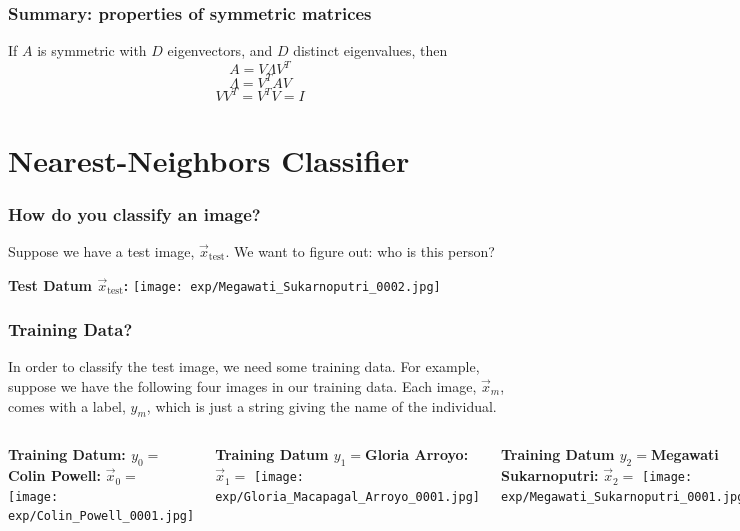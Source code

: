 \documentclass{beamer}
\begin{document}
\begin{frame}
  \frametitle{Summary: properties of symmetric matrices}
  If $A$ is symmetric with $D$ eigenvectors, and $D$ distinct eigenvalues, then
  \[
  A=V\Lambda V^T
  \]
  \[
  \Lambda = V^TAV
  \]
  \[
  VV^T=V^TV=I
  \]
\end{frame}


\section[NN]{Nearest-Neighbors Classifier}
\setcounter{subsection}{1}

\begin{frame}
  \frametitle{How do you classify an image?}

  Suppose we have a test image, $\vec{x}_{\mbox{test}}$.  We want to figure out:
  who is this person?

  \begin{centering}
    \begin{block}{\bf Test Datum $\vec{x}_{\mbox{test}}$:}
      \texttt{[image: exp/Megawati\_Sukarnoputri\_0002.jpg]}
    \end{block}
  \end{centering}
  
\end{frame}
    
\begin{frame}
  \frametitle{Training Data?}
  In order to classify the test image, we need some training data.
  For example, suppose we have the following four images in our
  training data.  Each image, $\vec{x}_m$, comes with a label, $y_m$,
  which is just a string giving the name of the individual.
  \begin{columns}
    \column{1.05in}
    \begin{block}{\bf Training Datum: $y_0=$Colin Powell:}
      $\vec{x}_0=$
      \texttt{[image: exp/Colin\_Powell\_0001.jpg]}
    \end{block}
    \column{1.05in}
    \begin{block}{\bf Training Datum $y_1=$Gloria Arroyo:}
      $\vec{x}_1=$
      \texttt{[image: exp/Gloria\_Macapagal\_Arroyo\_0001.jpg]}
    \end{block}
    \column{1.05in}
    \begin{block}{\bf Training Datum $y_2=$Megawati Sukarnoputri:}
      $\vec{x}_2=$
      \texttt{[image: exp/Megawati\_Sukarnoputri\_0001.jpg]}
    \end{block}
    \column{1.05in}
    \begin{block}{\bf Training Datum $y_3=$Tony Blair:}
      $\vec{x}_3=$
      \texttt{[image: exp/Tony\_Blair\_0001.jpg]}
    \end{block}
  \end{columns}
\end{frame}
    
\end{document}
